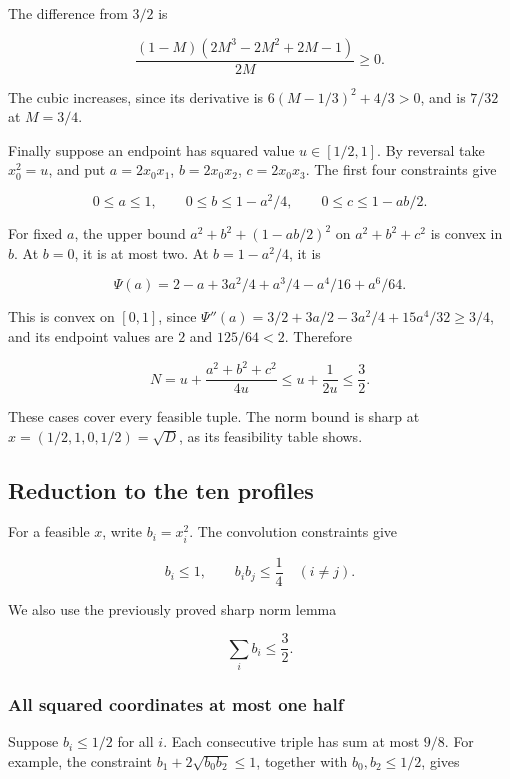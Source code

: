 The difference from \(3/2\) is

\[
\frac{(1-M)(2M^3-2M^2+2M-1)}{2M}\ge0.
\]

The cubic increases, since its derivative is
\(6(M-1/3)^2+4/3>0\), and is \(7/32\) at \(M=3/4\).

Finally suppose an endpoint has squared value \(u\in[1/2,1]\). By reversal
take \(x_0^2=u\), and put
\(a=2x_0x_1\), \(b=2x_0x_2\), \(c=2x_0x_3\). The first four constraints
give

\[
0\le a\le1,\qquad 0\le b\le1-a^2/4,\qquad 0\le c\le1-ab/2.
\]

For fixed \(a\), the upper bound \(a^2+b^2+(1-ab/2)^2\) on
\(a^2+b^2+c^2\) is convex in \(b\). At \(b=0\), it is at most two. At
\(b=1-a^2/4\), it is

\[
\Psi(a)=2-a+3a^2/4+a^3/4-a^4/16+a^6/64.
\]

This is convex on \([0,1]\), since
\(\Psi''(a)=3/2+3a/2-3a^2/4+15a^4/32\ge3/4\), and its endpoint values
are \(2\) and \(125/64<2\). Therefore

\[
N=u+\frac{a^2+b^2+c^2}{4u}\le u+\frac1{2u}\le\frac32.
\]

These cases cover every feasible tuple. The norm bound is sharp at
\(x=(1/2,1,0,1/2)=\sqrt D\), as its feasibility table shows.

\subsection{Reduction to the ten profiles}

For a feasible \(x\), write \(b_i=x_i^2\). The convolution constraints give

\begin{equation}\label{eq:a6}
b_i\le1,\qquad b_ib_j\le\frac14\quad(i\ne j).
\end{equation}

We also use the previously proved sharp norm lemma

\begin{equation}\label{eq:a7}
\sum_i b_i\le\frac32.
\end{equation}

\subsubsection{All squared coordinates at most one half}

Suppose \(b_i\le1/2\) for all \(i\). Each consecutive triple has sum at most
\(9/8\). For example, the constraint
\(b_1+2\sqrt{b_0b_2}\le1\), together with \(b_0,b_2\le1/2\), gives

